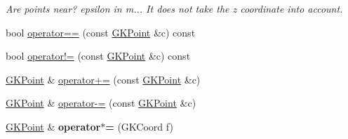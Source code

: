 \begin{DoxyCompactItemize}
\begin{DoxyCompactList}\small\item\em Are points near? epsilon in m... It does not take the z coordinate into account. \end{DoxyCompactList}\item 
bool \hyperlink{classGKPoint_a973a589ee0b1f38efcb71446f305e828}{operator==} (const \hyperlink{classGKPoint}{G\+K\+Point} \&c) const 
\item 
bool \hyperlink{classGKPoint_a22ea11710cf45ea674dd2751dd15db16}{operator!=} (const \hyperlink{classGKPoint}{G\+K\+Point} \&c) const 
\item 
\hyperlink{classGKPoint}{G\+K\+Point} \& \hyperlink{classGKPoint_afdf00b8a204e92706219fd6f713d51c5}{operator+=} (const \hyperlink{classGKPoint}{G\+K\+Point} \&c)
\item 
\hyperlink{classGKPoint}{G\+K\+Point} \& \hyperlink{classGKPoint_a0f8daa5b0e00dbe277ae2d13f7183ef1}{operator-\/=} (const \hyperlink{classGKPoint}{G\+K\+Point} \&c)
\item 
\hyperlink{classGKPoint}{G\+K\+Point} \& {\bfseries operator$\ast$=} (G\+K\+Coord f)\hypertarget{classGKPoint_a1096a53d592624099f3c377ea387386d}{}\label{classGKPoint_a1096a53d592624099f3c377ea387386d}


\end{DoxyCompactItemize}
